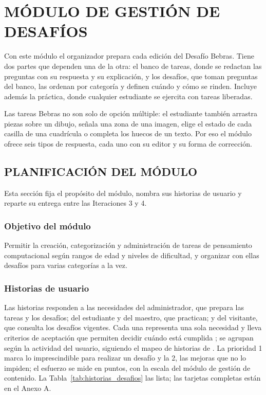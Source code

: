 \chapter{MÓDULO DE GESTIÓN DE DESAFÍOS}

Con este módulo el organizador prepara cada edición del Desafío Bebras. Tiene dos partes que dependen una de la otra: el banco de tareas, donde se redactan las preguntas con su respuesta y su explicación, y los desafíos, que toman preguntas del banco, las ordenan por categoría y definen cuándo y cómo se rinden. Incluye además la práctica, donde cualquier estudiante se ejercita con tareas liberadas.

Las tareas Bebras no son solo de opción múltiple: el estudiante también arrastra piezas sobre un dibujo, señala una zona de una imagen, elige el estado de cada casilla de una cuadrícula o completa los huecos de un texto. Por eso el módulo ofrece seis tipos de respuesta, cada uno con su editor y su forma de corrección.

\section{PLANIFICACIÓN DEL MÓDULO}

Esta sección fija el propósito del módulo, nombra sus historias de usuario y reparte su entrega entre las Iteraciones 3 y 4.

\subsection{Objetivo del módulo}

Permitir la creación, categorización y administración de tareas de pensamiento computacional según rangos de edad y niveles de dificultad, y organizar con ellas desafíos para varias categorías a la vez.

\subsection{Historias de usuario}

Las historias responden a las necesidades del administrador, que prepara las tareas y los desafíos; del estudiante y del maestro, que practican; y del visitante, que consulta los desafíos vigentes. Cada una representa una sola necesidad y lleva criterios de aceptación que permiten decidir cuándo está cumplida \parencite{cohn2004}; se agrupan según la actividad del usuario, siguiendo el mapeo de historias de \textcite{patton2014}. La prioridad 1 marca lo imprescindible para realizar un desafío y la 2, las mejoras que no lo impiden; el esfuerzo se mide en puntos, con la escala del módulo de gestión de contenido. La Tabla~\ref{tab:historias_desafios} las lista; las tarjetas completas están en el Anexo A.


